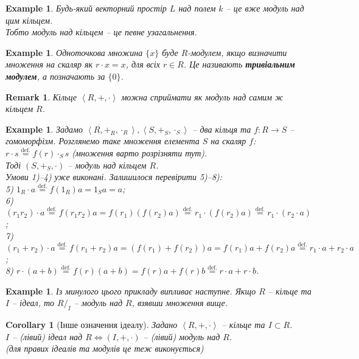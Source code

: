 \documentclass[a4paper, 10pt]{article}
\theoremstyle{theoremdd}
\theoremstyle{theoremdd}
\theoremstyle{theoremdd}
\theoremstyle{theoremdd}
\theoremstyle{theoremdd}
\newtheorem{example}[theorem]{Example}
\theoremstyle{theoremdd}
\theoremstyle{theoremdd}
\theoremstyle{theoremdd}
\theoremstyle{theoremdd}
\theoremstyle{theoremdd}
\theoremstyle{theoremdd}
\newtheorem{remark}[theorem]{Remark}
\theoremstyle{theoremdd}
\theoremstyle{theoremdd}
\theoremstyle{theoremdd}
\newtheorem{corollary}[theorem]{Corollary}
\theoremstyle{theoremdd}
\newcommand{\eqbydef}{\overset{\text{def.}}{=}}
\begin{document}
\begin{example}
Будь-який векторний простір $L$ над полем $k$ -- це вже модуль над цим кільцем.\\
Тобто модуль над кільцем -- це певне узагальнення.
\end{example}

\begin{example}
Одноточкова множина $\{x\}$ буде $R$-модулем, якщо визначити множення на скаляр як $r \cdot x = x$, для всіх $r \in R$. Це називають \textbf{тривіальним модулем}, а позначають за $\{0\}$.
\end{example}

\begin{remark}
Кільце $\left<R,+,\cdot\right>$ можна сприймати як модуль над самим ж кільцем $R$.
\end{remark}

\begin{example}
Задамо $\left<R,+_R,\cdot_R\right>,\left<S,+_S,\cdot_S\right>$ -- два кільця та $f \colon R \to S$ -- гомоморфізм. Розглянемо таке множення елемента $S$ на скаляр $f$:\\
$r \cdot s \eqbydef f(r) \cdot_S s$ (множення варто розрізняти тут).\\
Тоді $(S,+_S,\cdot)$ -- модуль над кільцем $R$.\\
Умови 1)--4) уже виконані. Залишилося перевірити 5)--8):\\
5) $1_R \cdot a \eqbydef f(1_R) a = 1_S a = a$;\\
6) $(r_1r_2) \cdot a \eqbydef f(r_1r_2)a = f(r_1)(f(r_2)a) \eqbydef r_1 \cdot (f(r_2)a) \eqbydef r_1 \cdot (r_2 \cdot a)$;\\
7) $(r_1+r_2) \cdot a \eqbydef f(r_1+r_2) a = (f(r_1)+f(r_2)) a = f(r_1) a + f(r_2) a \eqbydef r_1 \cdot a + r_2 \cdot a$;\\
8) $r \cdot (a+b) \eqbydef f(r) (a+b) = f(r) a + f(r) b \eqbydef r \cdot a + r \cdot b$.
\end{example}

\begin{example}
Із минулого цього прикладу випливає наступне. Якщо $R$ -- кільце та $I$ -- ідеал, то $R/_I$ -- модуль над $R$, взявши множення вище.
\end{example}

\begin{corollary}[Інше означення ідеалу]
Задано $\left<R,+,\cdot\right>$ -- кільце та $I \subset R$.\\
$I$ -- (лівий) ідеал над $R \iff (I,+,\cdot)$ -- (лівий) модуль над $R$.\\
(для правих ідеалів та модулів це теж виконується)
\end{corollary}
\end{document}
